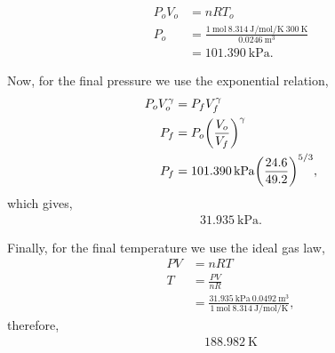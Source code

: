 \documentclass[main.tex]{subfiles}
\begin{document}
\begin{align*}
    P_oV_o &= nRT_o \\
    P_o &= \frac{\SI{1}{\mol}~\SI{8.314}{\joule\per\mol\per\kelvin}~\SI{300}{\kelvin}}{\SI{0.0246}{\meter\tothe{3}}} \\
    &= \SI{101.390}{\kilo\pascal}.
\end{align*}

Now, for the final pressure we use the exponential relation,
\begin{align*}
    P_oV_o^\gamma &= P_fV_f^\gamma \\
    P_f &= P_o\qty(\frac{V_o}{V_f})^\gamma \\
    P_f &= \SI{101.390}{\kilo\pascal}\qty(\frac{24.6}{49.2})^{5/3},
\end{align*}
which gives,
\begin{gather*}
    \boxed{\SI{31.935}{\kilo\pascal}.}
\end{gather*}

Finally, for the final temperature we use the ideal gas law,
\begin{align*}
    PV &= nRT \\
    T &= \frac{PV}{nR} \\
    &= \frac{\SI{31.935}{\kilo\pascal}~\SI{0.0492}{\meter\tothe{3}}}{\SI{1}{\mol}~\SI{8.314}{\joule\per\mol\per\kelvin}},
\end{align*}
therefore,
\begin{gather*}
    \boxed{\SI{188.982}{\kelvin}}
\end{gather*}

\end{document}
